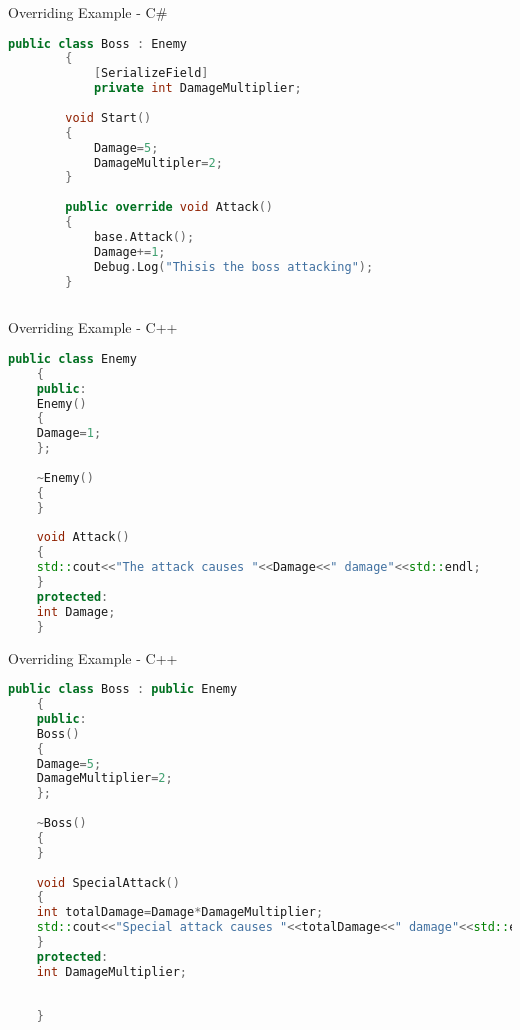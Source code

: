 \begin{frame}[fragile]{Overriding Example - C\#}
	\begin{lstlisting}[language=C++,basicstyle=\tiny,]
		public class Boss : Enemy
		{
			[SerializeField]
			private int DamageMultiplier; 
		
		void Start()
		{
			Damage=5;
			DamageMultipler=2;
		}
		
		public override void Attack()
		{
			base.Attack();
			Damage+=1;
			Debug.Log("Thisis the boss attacking");
		}
		
	\end{lstlisting}
\end{frame}

\begin{frame}[fragile]{Overriding Example - C++}
	\begin{lstlisting}[language=C++,basicstyle=\tiny,]
	public class Enemy
	{
	public:
	Enemy()
	{
	Damage=1;
	};
	
	~Enemy()
	{
	}
	
	void Attack()
	{
	std::cout<<"The attack causes "<<Damage<<" damage"<<std::endl;
	}
	protected:
	int Damage;
	}
	\end{lstlisting}
\end{frame}

\begin{frame}[fragile]{Overriding Example - C++}
	\begin{lstlisting}[language=C++,basicstyle=\tiny,]
	public class Boss : public Enemy
	{
	public:
	Boss()
	{
	Damage=5;
	DamageMultiplier=2;
	};
	
	~Boss()
	{
	}
	
	void SpecialAttack()
	{
	int totalDamage=Damage*DamageMultiplier;
	std::cout<<"Special attack causes "<<totalDamage<<" damage"<<std::endl;
	}	
	protected:
	int DamageMultiplier;
	
	
	}
	\end{lstlisting}
\end{frame}

